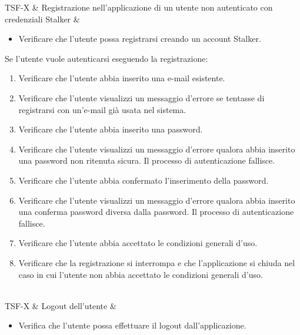 TSF-X & Registrazione nell'applicazione di un utente non autenticato con credenziali Stalker & \begin{itemize}
    \item Verificare che l'utente possa registrarsi creando un account Stalker.
\end{itemize}
Se l'utente vuole autenticarsi eseguendo la registrazione:
\begin{enumerate}
    \item Verificare che l'utente abbia inserito una e-mail esistente.
    \item Verificare che l'utente visualizzi un messaggio d'errore se tentasse di registrarsi con un'e-mail già usata nel sistema.
    \item Verificare che l'utente abbia inserito una password.
    \item Verificare che l'utente visualizzi un messaggio d'errore qualora abbia inserito una password non ritenuta sicura. Il processo di autenticazione fallisce.
    \item Verificare che l'utente abbia confermato l'inserimento della password.
    \item Verificare che l'utente visualizzi un messaggio d'errore qualora abbia inserito una conferma password diversa dalla password. Il processo di autenticazione fallisce.
    \item Verificare che l'utente abbia accettato le condizioni generali d'uso.
    \item Verificare che la registrazione si interrompa e che l'applicazione si chiuda nel caso in cui l'utente non abbia accettato le condizioni generali d'uso.
\end{enumerate} \\

TSF-X & Logout dell'utente & \begin{itemize}
    \item Verifica che l'utente possa effettuare il logout dall'applicazione.
\end{itemize} \\

